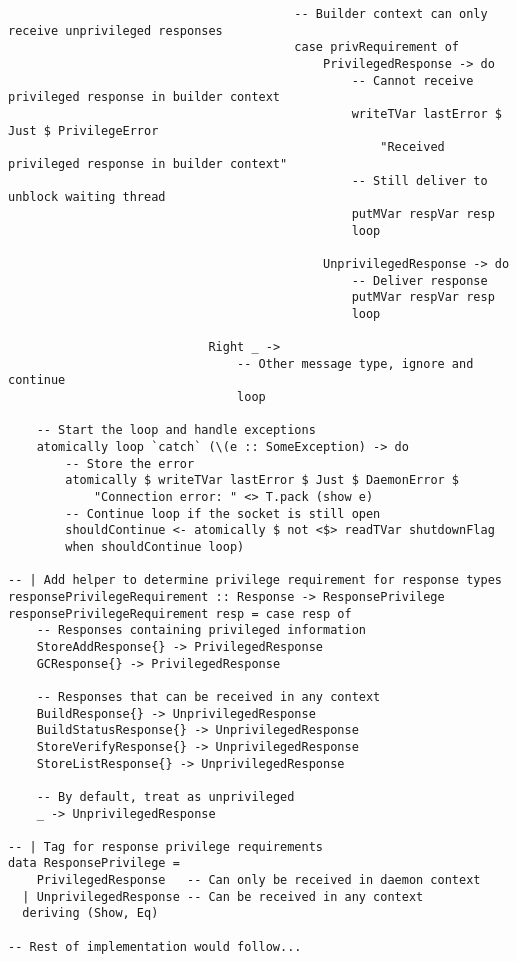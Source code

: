 \documentclass{article}
\begin{document}
\begin{tcolorbox}[title=Ten/Daemon/Client.hs Changes]
\begin{verbatim}
                                        -- Builder context can only receive unprivileged responses
                                        case privRequirement of
                                            PrivilegedResponse -> do
                                                -- Cannot receive privileged response in builder context
                                                writeTVar lastError $ Just $ PrivilegeError
                                                    "Received privileged response in builder context"
                                                -- Still deliver to unblock waiting thread
                                                putMVar respVar resp
                                                loop

                                            UnprivilegedResponse -> do
                                                -- Deliver response
                                                putMVar respVar resp
                                                loop

                            Right _ ->
                                -- Other message type, ignore and continue
                                loop

    -- Start the loop and handle exceptions
    atomically loop `catch` (\(e :: SomeException) -> do
        -- Store the error
        atomically $ writeTVar lastError $ Just $ DaemonError $
            "Connection error: " <> T.pack (show e)
        -- Continue loop if the socket is still open
        shouldContinue <- atomically $ not <$> readTVar shutdownFlag
        when shouldContinue loop)

-- | Add helper to determine privilege requirement for response types
responsePrivilegeRequirement :: Response -> ResponsePrivilege
responsePrivilegeRequirement resp = case resp of
    -- Responses containing privileged information
    StoreAddResponse{} -> PrivilegedResponse
    GCResponse{} -> PrivilegedResponse

    -- Responses that can be received in any context
    BuildResponse{} -> UnprivilegedResponse
    BuildStatusResponse{} -> UnprivilegedResponse
    StoreVerifyResponse{} -> UnprivilegedResponse
    StoreListResponse{} -> UnprivilegedResponse

    -- By default, treat as unprivileged
    _ -> UnprivilegedResponse

-- | Tag for response privilege requirements
data ResponsePrivilege =
    PrivilegedResponse   -- Can only be received in daemon context
  | UnprivilegedResponse -- Can be received in any context
  deriving (Show, Eq)

-- Rest of implementation would follow...
\end{verbatim}
\end{tcolorbox}
\end{document}
